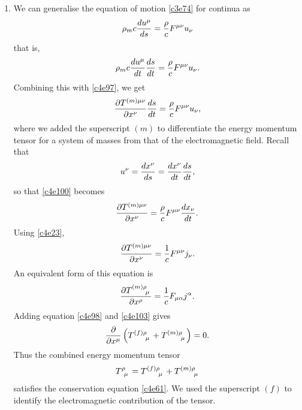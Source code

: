 \begin{enumerate}
\item We can generalise the equation of motion \eqref{c3e74} for continua as
\begin{equation}\label{c4e99}
\rho_m c\frac{d{u^\mu}}{d{s}} = \frac{\rho}{c}F^{\mu\nu}u_\nu
\end{equation}
that is,
\[
\rho_m c\frac{d{u^\mu}}{d{t}}\frac{d{s}}{d{t}} = \frac{\rho}{c}F^{\mu\nu}u_\nu.
\]
Combining this with \eqref{c4e97}, we get
\begin{equation}\label{c4e100}
\frac{\partial{T^{(m)\mu\nu}}}{\partial{x^\nu}}\frac{d{s}}{d{t}} = \frac{\rho}{c}F^{\mu\nu}u_\nu,
\end{equation}
where we added the superscript $(m)$ to differentiate the energy momentum tensor
for a system of masses from that of the electromagnetic field. Recall that
\[
u^\nu = \frac{d{x^\nu}}{d{s}} = \frac{d{x^\nu}}{d{t}}\frac{d{s}}{d{t}},
\]
so that \eqref{c4e100} becomes
\begin{equation}\label{c4e101}
\frac{\partial{T^{(m)\mu\nu}}}{\partial{x^\nu}} = \frac{\rho}{c}F^{\mu\nu}\frac{d{x_\nu}}{d{t}}.
\end{equation}
Using \eqref{c4e23},
\begin{equation}\label{c4e102}
\frac{\partial{T^{(m)\mu\nu}}}{\partial{x^\nu}} = \frac{1}{c}F^{\mu\nu}j_\nu.
\end{equation}
An equivalent form of this equation is
\begin{equation}\label{c4e103}
\pdt{\tensor{T}{^{(m)\rho}_\mu}}{x^\rho} = \frac{1}{c}F_{\mu\alpha}j^\alpha.
\end{equation}
Adding equation \eqref{c4e98} and \eqref{c4e103} gives
\begin{equation}\label{c4e104}
\frac{\partial}{\partial x^\mu}\left(\tensor{T}{^{(f)\rho}_\mu} + 
\tensor{T}{^{(m)\rho}_\mu}\right) = 0.
\end{equation}
Thus the combined energy momentum tensor 
\begin{equation}\label{c4e105}
\tensor{T}{^\rho_\mu} = \tensor{T}{^{(f)\rho}_\mu} + \tensor{T}{^{(m)\rho}_\mu}
\end{equation}
satisfies the conservation equation \eqref{c4e61}. We used the superscript $(f)$
to identify the electromagnetic contribution of the tensor.


\end{enumerate}
